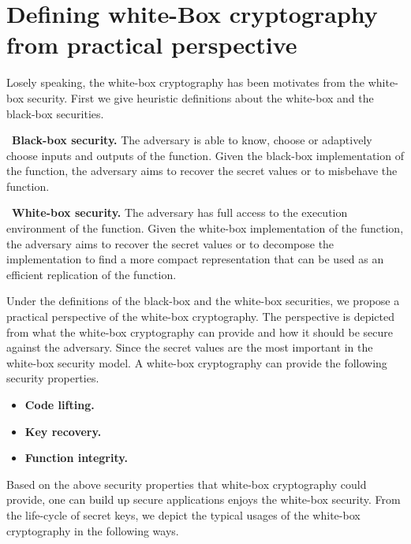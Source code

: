 \documentclass{SCIS2018}
\begin{document}
\section{Defining white-Box cryptography from practical perspective}
Losely speaking, the white-box cryptography has been motivates from the white-box security. First we give heuristic definitions about the white-box and the black-box securities.

~\textbf{Black-box security.} {The adversary is able to know, choose or adaptively choose inputs and outputs of the function. Given the black-box implementation of the function, the adversary aims to recover the secret values or to misbehave the function.}

~\textbf{White-box security.} {The adversary has full access to the execution environment of the function. Given the white-box implementation of the function, the adversary aims to recover the secret values or to decompose the implementation to find a more compact representation that can be used as an efficient replication of the function.}

Under the definitions of the black-box and the white-box securities, we propose a practical perspective of the white-box cryptography. The perspective is depicted from what the white-box cryptography can provide and how it should be secure against the adversary. Since the secret values are the most important in the white-box security model. A white-box cryptography can provide the following security properties.

\begin{itemize}
\item \textbf{Code lifting.}

\item \textbf{Key recovery.}

\item \textbf{Function integrity.}

\end{itemize}

Based on the above security properties that white-box cryptography could provide, one can build  up secure applications enjoys the white-box security. From the life-cycle of secret keys, we depict the typical usages of the white-box cryptography in the following ways.
\end{document}
